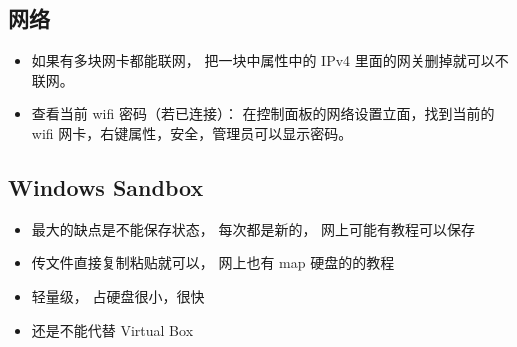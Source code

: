 \subsection{网络}
\begin{itemize}
\item 如果有多块网卡都能联网， 把一块中属性中的 IPv4 里面的网关删掉就可以不联网。
\item 查看当前 wifi 密码（若已连接）： 在控制面板的网络设置立面，找到当前的 wifi 网卡，右键属性，安全，管理员可以显示密码。
\end{itemize}

\subsection{Windows Sandbox}
\begin{itemize}
\item 最大的缺点是不能保存状态， 每次都是新的， 网上可能有教程可以保存
\item 传文件直接复制粘贴就可以， 网上也有 map 硬盘的的教程
\item 轻量级， 占硬盘很小，很快
\item 还是不能代替 Virtual Box
\end{itemize}
